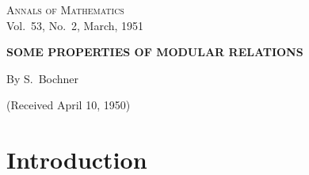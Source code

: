 \documentclass[12pt]{article}
\begin{document}
\thispagestyle{empty}

\begin{center}
\textsc{Annals of Mathematics}\\
Vol.~53, No.~2, March, 1951

\vspace{2em}

\textbf{SOME PROPERTIES OF MODULAR RELATIONS}

\vspace{1em}

By S.~Bochner

\vspace{0.5em}

(Received April 10, 1950)
\end{center}

\section*{Introduction}
\end{document}
